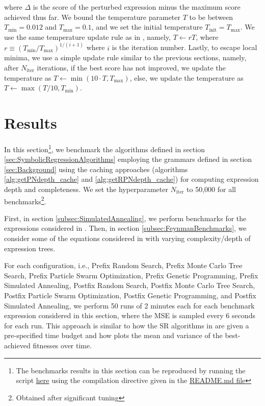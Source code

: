 \documentclass[runningheads]{llncs}
\begin{document}
where $\Delta$ is the score of the perturbed expression minus the maximum score achieved thus far. We bound the temperature parameter $T$ to be between $T_{\mathrm{min}} = 0.012$ and $T_{\mathrm{max}} = 0.1$, and we set the initial temperature $T_{\mathrm{init}} = T_{\mathrm{max}}$. We use the same temperature update rule as in \cite{10.1145/3449639.3459345}, namely, $T \gets rT$, where $r \equiv \left(T_{\mathrm{min}}/T_{\mathrm{max}}\right)^{1/(i+1)}$ where $i$ is the iteration number. Lastly, to escape local minima, we use a simple update rule similar to the previous sections, namely, after $N_{\mathrm{iter}}$ iterations, if the best score has not improved, we update the temperature as $T \gets \min{\left(10\cdot T, T_{\mathrm{max}}\right)}$, else, we update the temperature as $T \gets \max{\left(T/10, T_{\mathrm{min}}\right)}$.

\section{Results}\label{sec:Results}
In this section\footnote{The benchmarks results in this section can be reproduced by running the script \href{https://github.com/edfink234/Alpha-Zero-Symbolic-Regression/blob/dce0e2ddd1a172598dcae31b738900ce9e6403e9/PrefixPostfixSR.cpp}{here} using the compilation directive given in the \href{https://github.com/edfink234/Alpha-Zero-Symbolic-Regression/blob/dce0e2ddd1a172598dcae31b738900ce9e6403e9/README.md}{README.md file}}, we benchmark the algorithms defined in section \ref{sec:SymbolicRegressionAlgorithms} employing the grammars defined in section \ref{sec:Background} using the caching approaches (algorithms \ref{alg:getPNdepth_cache} and \ref{alg:getRPNdepth_cache}) for computing expression depth and completeness. We set the hyperparameter $N_{\mathrm{iter}}$ to 50,000 for all benchmarks\footnote{Obtained after significant tuning}.
\par First, in section \ref{subsec:SimulatedAnnealing}, we perform benchmarks for the expressions considered in \cite{hemberg2008pre}. Then, in section \ref{subsec:FeynmanBenchmarks}, we consider some of the equations considered in \cite{udrescu2020ai} with varying complexity/depth of expression trees.
\par For each configuration, i.e., Prefix Random Search, Prefix Monte Carlo Tree Search, Prefix Particle Swarm Optimization, Prefix Genetic Programming,  Prefix Simulated Annealing, Postfix Random Search, Postfix Monte Carlo Tree Search, Postfix Particle Swarm Optimization, Postfix Genetic Programming, and Postfix Simulated Annealing, we perform 50 runs of 2 minutes each for each benchmark expression considered in this section, where the MSE is sampled every 6 seconds for each run.  
This approach is similar to how the SR algorithms in \cite{defranca2023interpretable} are given a pre-specified time budget and how \cite{manti2023discovering} plots the mean and variance of the best-achieved fitnesses over time. 
\end{document}

